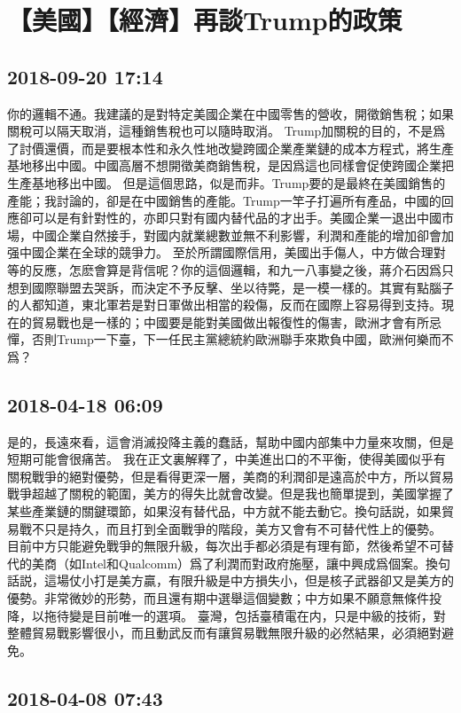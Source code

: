 \documentclass[twocolumn]{ctexart}
\begin{document}
\section*{【美國】【經濟】再談Trump的政策}
\subsection*{2018-09-20 17:14}

你的邏輯不通。我建議的是對特定美國企業在中國零售的營收，開徵銷售稅；如果關稅可以隔天取消，這種銷售稅也可以隨時取消。
Trump加關稅的目的，不是爲了討價還價，而是要根本性和永久性地改變跨國企業產業鏈的成本方程式，將生產基地移出中國。中國高層不想開徵美商銷售稅，是因爲這也同樣會促使跨國企業把生產基地移出中國。
但是這個思路，似是而非。Trump要的是最終在美國銷售的產能；我討論的，卻是在中國銷售的產能。Trump一竿子打遍所有產品，中國的回應卻可以是有針對性的，亦即只對有國内替代品的才出手。美國企業一退出中國市場，中國企業自然接手，對國内就業總數並無不利影響，利潤和產能的增加卻會加强中國企業在全球的競爭力。
至於所謂國際信用，美國出手傷人，中方做合理對等的反應，怎麽會算是背信呢？你的這個邏輯，和九一八事變之後，蔣介石因爲只想到國際聯盟去哭訴，而決定不予反擊、坐以待斃，是一模一樣的。其實有點腦子的人都知道，東北軍若是對日軍做出相當的殺傷，反而在國際上容易得到支持。現在的貿易戰也是一樣的；中國要是能對美國做出報復性的傷害，歐洲才會有所忌憚，否則Trump一下臺，下一任民主黨總統約歐洲聯手來欺負中國，歐洲何樂而不爲？
\subsection*{2018-04-18 06:09}

是的，長遠來看，這會消滅投降主義的蠢話，幫助中國内部集中力量來攻關，但是短期可能會很痛苦。 
我在正文裏解釋了，中美進出口的不平衡，使得美國似乎有關稅戰爭的絕對優勢，但是看得更深一層，美商的利潤卻是遠高於中方，所以貿易戰爭超越了關稅的範圍，美方的得失比就會改變。但是我也簡單提到，美國掌握了某些產業鏈的關鍵環節，如果沒有替代品，中方就不能去動它。換句話説，如果貿易戰不只是持久，而且打到全面戰爭的階段，美方又會有不可替代性上的優勢。 
目前中方只能避免戰爭的無限升級，每次出手都必須是有理有節，然後希望不可替代的美商（如Intel和Qualcomm）爲了利潤而對政府施壓，讓中興成爲個案。換句話説，這場仗小打是美方贏，有限升級是中方損失小，但是核子武器卻又是美方的優勢。非常微妙的形勢，而且還有期中選舉這個變數；中方如果不願意無條件投降，以拖待變是目前唯一的選項。 
臺灣，包括臺積電在内，只是中級的技術，對整體貿易戰影響很小，而且動武反而有讓貿易戰無限升級的必然結果，必須絕對避免。
\subsection*{2018-04-08 07:43}
\end{document}
